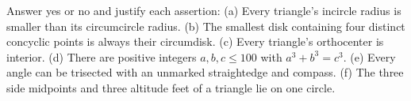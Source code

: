 Answer yes or no and justify each assertion: (a) Every triangle's incircle radius is smaller than its circumcircle radius. (b) The smallest disk containing four distinct concyclic points is always their circumdisk. (c) Every triangle's orthocenter is interior. (d) There are positive integers $a,b,c\le100$ with $a^3+b^3=c^3$. (e) Every angle can be trisected with an unmarked straightedge and compass. (f) The three side midpoints and three altitude feet of a triangle lie on one circle.
